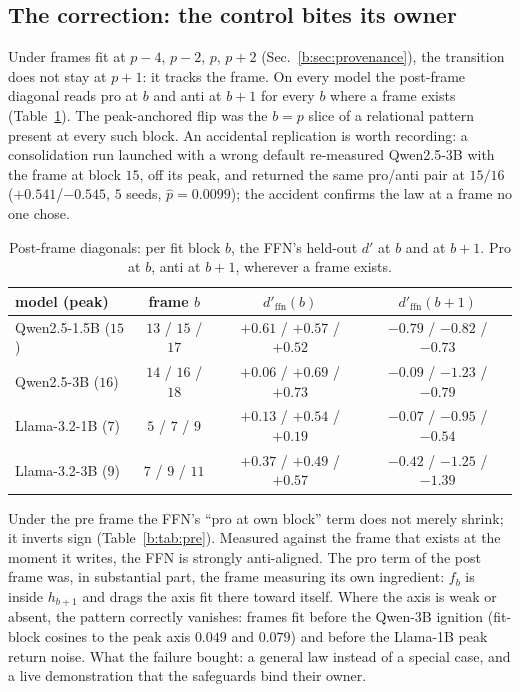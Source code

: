 \documentclass[11pt]{article}
\begin{document}
\subsection{The correction: the control bites its owner}
\label{b:sec:correction}

Under frames fit at $p{-}4$, $p{-}2$, $p$, $p{+}2$
(Sec.~\ref{b:sec:provenance}), the transition does not stay at $p{+}1$: it
tracks the frame. On every model the post-frame diagonal reads pro at $b$
and anti at $b{+}1$ for every $b$ where a frame exists
(Table~\ref{b:tab:post}). The peak-anchored flip was the $b{=}p$ slice of a
relational pattern present at every such block. An accidental replication
is worth recording: a consolidation run launched with a wrong default
re-measured Qwen2.5-3B with the frame at block $15$, off its peak, and
returned the same pro/anti pair at $15/16$ ($+0.541$/$-0.545$, $5$ seeds,
$\hat p = 0.0099$); the accident confirms the law at a frame no one chose.

\begin{table}[H]
\centering
\caption{Post-frame diagonals: per fit block $b$, the FFN's held-out $d'$
at $b$ and at $b{+}1$. Pro at $b$, anti at $b{+}1$, wherever a frame
exists.}
\label{b:tab:post}
\begin{tabular}{lccc}
\toprule
model (peak) & frame $b$ & $d'_{\mathrm{ffn}}(b)$ & $d'_{\mathrm{ffn}}(b{+}1)$ \\
\midrule
Qwen2.5-1.5B ($15$) & $13$ / $15$ / $17$ & $+0.61$ / $+0.57$ / $+0.52$ & $-0.79$ / $-0.82$ / $-0.73$ \\
Qwen2.5-3B ($16$)   & $14$ / $16$ / $18$ & $+0.06$ / $+0.69$ / $+0.73$ & $-0.09$ / $-1.23$ / $-0.79$ \\
Llama-3.2-1B ($7$)  & $5$ / $7$ / $9$    & $+0.13$ / $+0.54$ / $+0.19$ & $-0.07$ / $-0.95$ / $-0.54$ \\
Llama-3.2-3B ($9$)  & $7$ / $9$ / $11$   & $+0.37$ / $+0.49$ / $+0.57$ & $-0.42$ / $-1.25$ / $-1.39$ \\
\bottomrule
\end{tabular}
\end{table}

Under the pre frame the FFN's ``pro at own block'' term does not merely
shrink; it inverts sign (Table~\ref{b:tab:pre}). Measured against the frame
that exists at the moment it writes, the FFN is strongly anti-aligned. The
pro term of the post frame was, in substantial part, the frame measuring
its own ingredient: $f_b$ is inside $h_{b+1}$ and drags the axis fit there
toward itself. Where the axis is weak or absent, the pattern correctly
vanishes: frames fit before the Qwen-3B ignition (fit-block cosines to the
peak axis $0.049$ and $0.079$) and before the Llama-1B peak return noise.
What the failure bought: a general law instead of a special case, and a
live demonstration that the safeguards bind their owner.
\end{document}
